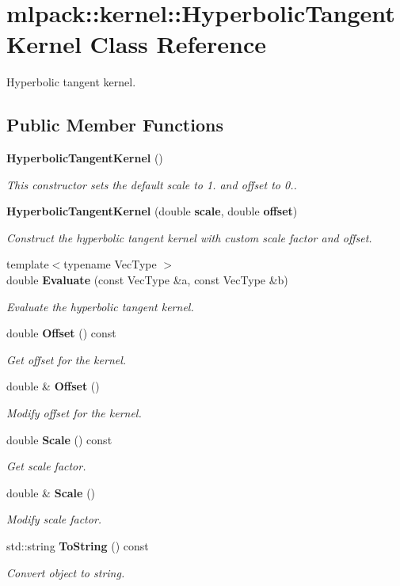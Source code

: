 \section{mlpack\-:\-:kernel\-:\-:Hyperbolic\-Tangent\-Kernel Class Reference}
\label{classmlpack_1_1kernel_1_1HyperbolicTangentKernel}


Hyperbolic tangent kernel.  


\subsection*{Public Member Functions}
\begin{DoxyCompactItemize}
\item 
{\bf Hyperbolic\-Tangent\-Kernel} ()
\begin{DoxyCompactList}\small\item\em This constructor sets the default scale to 1. and offset to 0.. \end{DoxyCompactList}\item 
{\bf Hyperbolic\-Tangent\-Kernel} (double {\bf scale}, double {\bf offset})
\begin{DoxyCompactList}\small\item\em Construct the hyperbolic tangent kernel with custom scale factor and offset. \end{DoxyCompactList}\item 
{\footnotesize template$<$typename Vec\-Type $>$ }\\double {\bf Evaluate} (const Vec\-Type \&a, const Vec\-Type \&b)
\begin{DoxyCompactList}\small\item\em Evaluate the hyperbolic tangent kernel. \end{DoxyCompactList}\item 
double {\bf Offset} () const 
\begin{DoxyCompactList}\small\item\em Get offset for the kernel. \end{DoxyCompactList}\item 
double \& {\bf Offset} ()
\begin{DoxyCompactList}\small\item\em Modify offset for the kernel. \end{DoxyCompactList}\item 
double {\bf Scale} () const 
\begin{DoxyCompactList}\small\item\em Get scale factor. \end{DoxyCompactList}\item 
double \& {\bf Scale} ()
\begin{DoxyCompactList}\small\item\em Modify scale factor. \end{DoxyCompactList}\item 
std\-::string {\bf To\-String} () const 
\begin{DoxyCompactList}\small\item\em Convert object to string. \end{DoxyCompactList}\end{DoxyCompactItemize}
